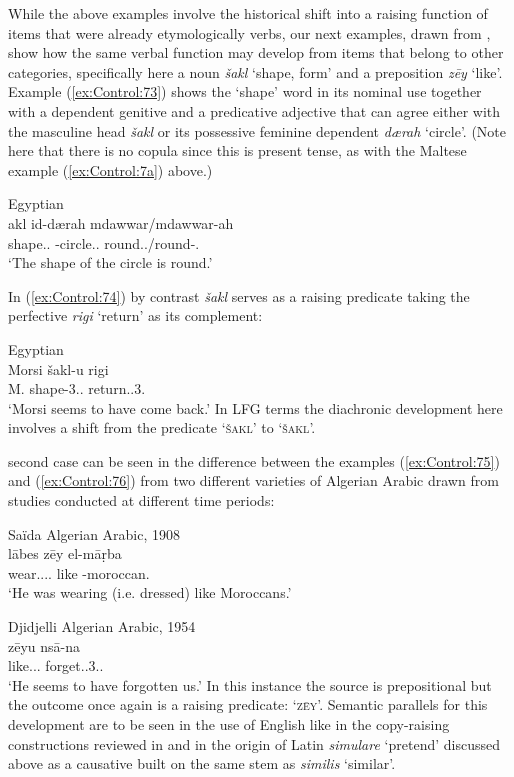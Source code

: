 \documentclass[output=paper,hidelinks]{langscibook}
\begin{document}
While the above examples involve the historical shift into a raising function of items that were already etymologically verbs, our next examples, drawn from \citet{CamilleriSadler2019}, show how the same verbal function may develop from items that belong to other categories, specifically here a noun \emph{\v{s}akl} `shape, form' and a preposition \emph{z{\=e}y} `like'. Example (\ref{ex:Control:73}) shows the `shape' word in its nominal use together with a dependent genitive and a predicative adjective that can agree either with the masculine head \emph{\v{s}akl} or its possessive feminine dependent \emph{d{\ae}rah} `circle'. (Note here that there is no copula since this is present tense, as with the Maltese example (\ref{ex:Control:7a}) above.)

\ea\label{ex:Control:73}Egyptian\\
akl  id-d{\ae}rah   mdawwar/mdawwar-ah\\
    {shape.\M.\SG} {\DEF-circle.\F.\SG}  round.\M.\SG/round-\F.\SG\\
\glt    `The shape of the circle is round.'  
\z
                
In (\ref{ex:Control:74}) by contrast \emph{\v{s}akl} serves as a raising predicate taking the perfective \emph{rigi{\textrevglotstop}} `return' as its complement:

\ea\label{ex:Control:74}Egyptian\\
\gll Morsi {\v{s}}akl-u     rigi{\textrevglotstop}\\
 M.   {shape-3\M.\SG.\GEN}  return.\PFV.3\M.\SG\\
\glt    `Morsi seems to have come back.' 
 \z
 In LFG terms the diachronic development here involves a shift from the predicate `\textsc{\v{s}akl\arglist{\POSS}}' to `\textsc{\v{s}akl\arglist{\XCOMP}\SUBJ}'.

  second case can be seen in the difference between the examples (\ref{ex:Control:75}) and (\ref{ex:Control:76}) from two different varieties of Algerian Arabic drawn from studies conducted at different time periods:

\ea\label{ex:Control:75}Sa{\"i}da Algerian Arabic, 1908\\
\gll l{\=a}bes      z{\=e}y el-m{\textgamma}{\=a}{\d{r}}ba\\
 {wear..\PTCP.\M.\SG}  like \DEF-moroccan.\PL\\
\glt `He was wearing (i.e. dressed) like Moroccans.'
 \z
 
 \ea\label{ex:Control:76}Djidjelli Algerian Arabic, 1954\\
\gll z{\=e}yu     ns{\=a}-na\\
{like.\M.\SG.\GEN}  forget.\PFV.3\M.\PL.\ACC\\
\glt `He seems to have forgotten us.'
 \z 
In this instance the source is prepositional but the outcome once again is a raising predicate: `\textsc{z\=ey\arglist{\XCOMP}\SUBJ}'. Semantic parallels for this development are to be seen in the use of English like in the copy-raising constructions reviewed in  and in the origin of Latin \emph{simulare} `pretend' discussed above as a causative built on the same stem as \emph{similis} `similar'.
\end{document}
